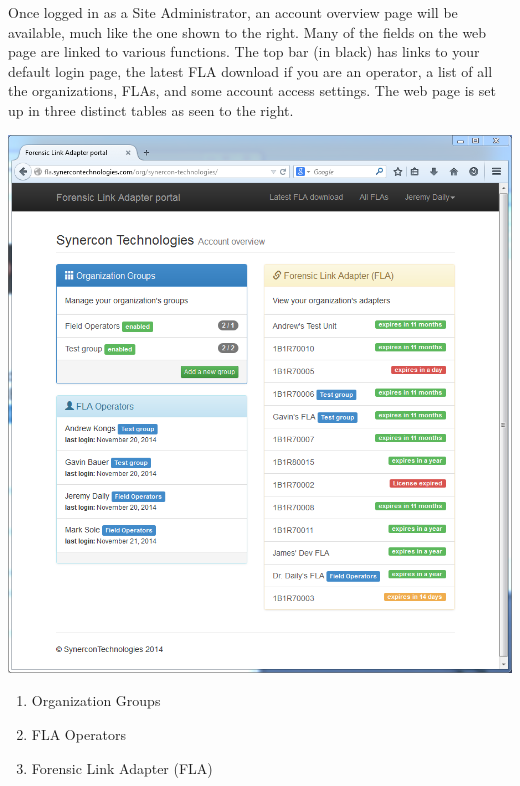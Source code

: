 \documentclass[11pt, oneside]{book}
\begin{document}
\noindent\begin{minipage}{0.45\textwidth}%
Once logged in as a Site Administrator, an account overview page will
be available, much like the one shown to the right.
Many of the fields on the web page are linked to various functions.
The top bar (in black) has links to your default login page, the latest
FLA download if you are an operator, a list of all the organizations,
FLAs, and some account access settings. The web page is set up in
three distinct tables as seen to the right.
\end{minipage}%
\hfill%
\begin{minipage}{0.50\textwidth} 
	\includegraphics[width=.8\textwidth]{../media/fla_portal_screenshots/FLAPortalAccountOverviewScreenShot}
\end{minipage}




\begin{enumerate}
\item Organization Groups
\item FLA Operators
\item Forensic Link Adapter (FLA)
\end{enumerate}
\end{document}
